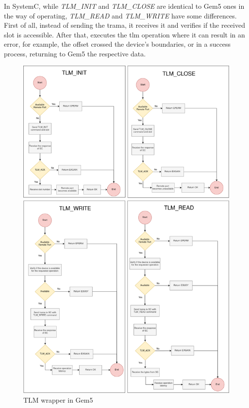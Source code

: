 In SystemC, while \textit{TLM\_INIT} and \textit{TLM\_CLOSE} are identical to Gem5 ones in the way of operating, \textit{TLM\_READ} and 
\textit{TLM\_WRITE} have some differences. First of all, instead of sending the trama, it receives it and verifies if the received slot is accessible.
After that, executes the \gls{tlm} operation where it can result in an error, for example, the offset crossed the device's boundaries, or in 
a success process, returning to Gem5 the respective data.


\begin{figure}[H]
	\centering
 	\includegraphics[width=0.8\linewidth]{Images/TLMWrapper_Gem5.png} 
 	\caption{TLM wrapper in Gem5}
\end{figure}

